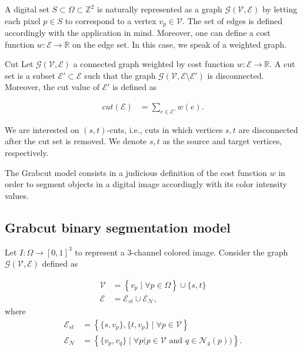 A digital set $S \subset \Omega \subset \mathbb{Z}^2$ is naturally represented as a graph $\mathcal{G}(\mathcal{V},\mathcal{E})$ by letting each pixel $p \in S$ to correspond to a vertex $v_p \in \mathcal{V}$. The set of edges is defined accordingly with the application in mind. Moreover, one can define a cost function $w:\mathcal{E}\rightarrow \mathbb{R}$ on the edge set. In this case, we speak of a weighted graph.

\begin{definition}{Cut}
Let $\mathcal{G}(\mathcal{V},\mathcal{E})$ a connected graph weighted  by cost function $w:\mathcal{E}\rightarrow \mathbb{R}$. A cut set is a subset $\mathcal{E}' \subset \mathcal{E}$ such that the graph $\mathcal{G}(\mathcal{V},\mathcal{E} \setminus \mathcal{E}')$ is disconnected. Moreover, the cut value of $\mathcal{E}'$ is defined as

\begin{align*}
	cut(\mathcal{E}) &= \sum_{e \in \mathcal{E}'}{w(e)}.
\end{align*}
\end{definition}

We are interested on $(s,t)$-cuts, i.e., cuts in which vertices $s,t$ are disconnected after the cut set is removed. We denote $s,t$ as the source and target vertices, respectively. 


The Grabcut model consists in a judicious definition of the cost function $w$ in order to segment objects in a digital image accordingly with its color intensity values.

\subsection{Grabcut binary segmentation model}
Let $I:\Omega\rightarrow [0,1]^3$ to represent a $3$-channel colored image. Consider the graph $\mathcal{G}(\mathcal{V},\mathcal{E})$ defined as

\begin{align*}
	\mathcal{V} &= \left\{ v_p \; | \; \forall p \in \Omega \right\} \cup \{s,t\}\\
	\mathcal{E} &= \mathcal{E}_{st} \cup \mathcal{E}_{\mathcal{N}},
\end{align*}
where 
\begin{align*}
\mathcal{E}_{st} &= \left\{ \{s,v_p\}, \{t,v_p\} \; | \; \forall p \in \mathcal{V}  \right\} \\
\mathcal{E}_{\mathcal{N}} &= \left\{ \{v_p,v_q\} \; | \; \forall p\big( p \in \mathcal{V} \text{ and } q\in \mathcal{N}_4(p) \big)  \right\}.
\end{align*}

